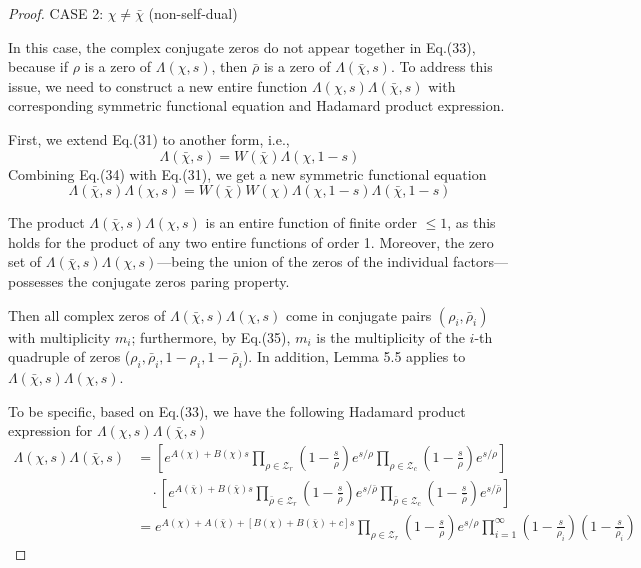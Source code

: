 \documentclass[12pt]{article}
\begin{document}
\begin{proof}
 CASE 2: $\chi\neq\bar{\chi}$ (non-self-dual)

 In this case, the complex conjugate zeros do not appear together in Eq.(33), because if $\rho$ is a zero of $\Lambda(\chi, s)$, then $\bar{\rho}$ is a zero of $\Lambda(\bar{\chi}, s)$. To address this issue, we need to construct a new entire function $\Lambda(\chi, s)\Lambda(\bar{\chi}, s)$ with corresponding symmetric functional equation and Hadamard product expression.

 First, we extend Eq.(31) to another form, i.e.,
 \begin{equation} \Lambda(\bar{\chi}, s) = W(\bar{\chi}) \Lambda(\chi, 1-s) \end{equation}
 Combining Eq.(34) with Eq.(31), we get a new symmetric functional equation
 \begin{equation} \Lambda(\bar{\chi}, s) \Lambda(\chi, s)= W(\bar{\chi})W(\chi) \Lambda(\chi, 1-s)\Lambda(\bar{\chi}, 1-s) \end{equation}

 The product $\Lambda(\bar{\chi}, s)\Lambda(\chi, s)$ is an entire function of finite order $\leq 1$, as this holds for the product of any two entire functions of order 1.
 Moreover, the zero set of $\Lambda(\bar{\chi}, s)\Lambda(\chi, s)$—being the union of the zeros of the individual factors—possesses the conjugate zeros paring property.

 Then all complex zeros of $\Lambda(\bar{\chi}, s)\Lambda(\chi, s)$  come in conjugate pairs $(\rho_i, \bar\rho_i)$ with multiplicity $m_i$; furthermore, by Eq.(35), $m_i$ is the multiplicity of the $i$-th quadruple of zeros ($\rho_i, \bar\rho_i, 1-\rho_i, 1-\bar\rho_i$). In addition, Lemma 5.5 applies to $\Lambda(\bar{\chi}, s)\Lambda(\chi, s)$.

 To be specific, based on Eq.(33), we have the following Hadamard product expression for $\Lambda(\chi, s)\Lambda(\bar{\chi}, s)$
\begin{equation}\begin{split}
\Lambda(\chi, s) \Lambda(\bar{\chi}, s)
&= \left[ e^{A(\chi) + B(\chi)s} \prod_{\rho \in \mathcal{Z}_r} \left(1 - \frac{s}{\rho}\right)e^{s/\rho} \prod_{\rho \in \mathcal{Z}_c} \left(1 - \frac{s}{\rho}\right)e^{s/\rho} \right] \\
&\quad \cdot \left[ e^{A(\bar\chi) + B(\bar\chi)s} \prod_{\bar\rho \in \mathcal{Z}_r} \left(1 - \frac{s}{\bar\rho}\right)e^{s/\bar\rho} \prod_{\bar\rho \in \mathcal{Z}_c} \left(1 - \frac{s}{\bar\rho}\right)e^{s/\bar\rho} \right] \\
&= e^{A(\chi) + A(\bar\chi) + [B(\chi)+B(\bar\chi)+c]s} \prod_{\rho \in \mathcal{Z}_r}\left(1-\frac{s}{\rho}\right)e^{s/\rho} \prod_{i=1}^{\infty}\left(1-\frac{s}{\rho_i}\right)\left(1-\frac{s}{\bar{\rho}_i}\right)
\end{split}\end{equation}


\end{proof}
\end{document}
